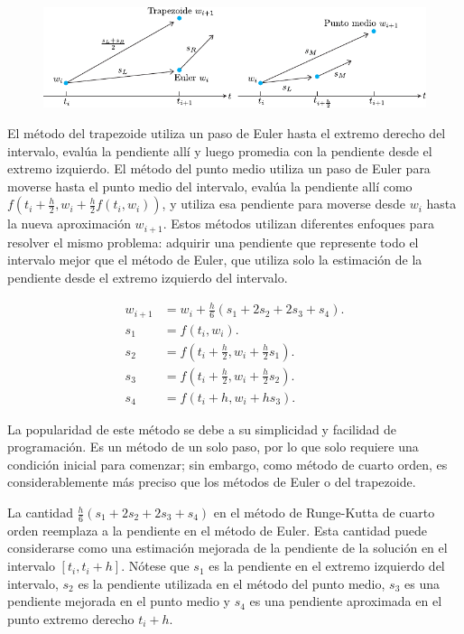 \begin{figure}[ht!]
    \centering
    \includegraphics[width=.6\paperwidth]{midpoint}
\end{figure}

El método del trapezoide utiliza un paso de Euler hasta el extremo
derecho del intervalo, evalúa la pendiente allí y luego promedia con
la pendiente desde el extremo izquierdo.
El método del punto medio utiliza un paso de Euler para moverse hasta
el punto medio del intervalo, evalúa la pendiente allí como
\begin{math}
    f
    \left(
    t_{i}+\frac{h}{2},
    w_{i}+\frac{h}{2}
    f\left(t_{i},w_{i}\right)
    \right)
\end{math},
y utiliza esa pendiente para moverse desde $w_{i}$ hasta la nueva
aproximación $w_{i+1}$.
Estos métodos utilizan diferentes enfoques para resolver el mismo
problema: adquirir una
pendiente que represente todo el intervalo mejor que el método de
Euler, que utiliza solo la estimación de la pendiente desde el
extremo izquierdo del intervalo.

\begin{align*}
    w_{i+1} & =
    w_{i}+
    \frac{h}{6}
    \left(s_{1}+2s_{2}+2s_{3}+s_{4}\right).                 \\
    s_{1}   & =
    f\left(t_{i},w_{i}\right).                              \\
    s_{2}   & =
    f\left(t_{i}+\frac{h}{2},w_{i}+\frac{h}{2}s_{1}\right). \\
    s_{3}   & =
    f\left(t_{i}+\frac{h}{2},w_{i}+\frac{h}{2}s_{2}\right). \\
    s_{4}   & =
    f\left(t_{i}+h,w_{i}+hs_{3}\right).
\end{align*}

La popularidad de este método se debe a su simplicidad y facilidad de programación.
Es un método de un solo paso, por lo que solo requiere una condición
inicial para comenzar; sin embargo, como método de cuarto orden, es
considerablemente más preciso que los métodos de Euler o del
trapezoide.

La cantidad $\frac{h}{6}\left(s_{1}+2s_{2}+2s_{3}+s_{4}\right)$ en el
método de Runge-Kutta de cuarto orden reemplaza a la pendiente en el
método de Euler.
Esta cantidad puede considerarse como una estimación mejorada de la
pendiente de la solución en el intervalo $\left[t_{i},t_{i}+h\right]$.
Nótese que $s_{1}$ es la pendiente en el extremo izquierdo del intervalo,
$s_{2}$ es la pendiente utilizada en el método del punto medio,
$s_{3}$ es una pendiente mejorada en el punto medio y $s_{4}$ es una
pendiente aproximada en el punto extremo derecho $t_{i}+h$.

